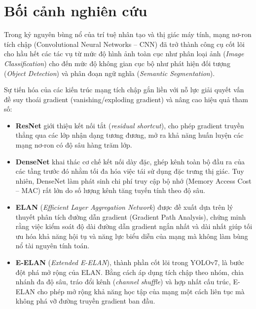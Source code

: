 \documentclass[fontsize=13pt,a4paper,oneside,DIV=calc,chapterprefix=true]{scrbook}
\begin{document}
\section{Bối cảnh nghiên cứu}
Trong kỷ nguyên bùng nổ của trí tuệ nhân tạo và thị giác máy tính, mạng nơ-ron tích chập (Convolutional Neural Networks -- CNN) đã trở thành công cụ cốt lõi cho hầu hết các tác vụ từ mức độ hình ảnh toàn cục như phân loại ảnh (\textit{Image Classification}) cho đến mức độ không gian cục bộ như phát hiện đối tượng (\textit{Object Detection}) và phân đoạn ngữ nghĩa (\textit{Semantic Segmentation}). 

Sự tiến hóa của các kiến trúc mạng tích chập gắn liền với nỗ lực giải quyết vấn đề suy thoái gradient (vanishing/exploding gradient) và nâng cao hiệu quả tham số:
\begin{itemize}[leftmargin=1.2cm]
    \item \textbf{ResNet} giới thiệu kết nối tắt (\textit{residual shortcut}), cho phép gradient truyền thẳng qua các lớp nhận dạng tương đương, mở ra khả năng huấn luyện các mạng nơ-ron có độ sâu hàng trăm lớp.
    \item \textbf{DenseNet} khai thác cơ chế kết nối dày đặc, ghép kênh toàn bộ đầu ra của các tầng trước đó nhằm tối đa hóa việc tái sử dụng đặc trưng thị giác. Tuy nhiên, DenseNet làm phát sinh chi phí truy cập bộ nhớ (Memory Access Cost -- MAC) rất lớn do số lượng kênh tăng tuyến tính theo độ sâu.
    \item \textbf{ELAN} (\textit{Efficient Layer Aggregation Network}) được đề xuất dựa trên lý thuyết phân tích đường dẫn gradient (Gradient Path Analysis), chứng minh rằng việc kiểm soát độ dài đường dẫn gradient ngắn nhất và dài nhất giúp tối ưu hóa khả năng hội tụ và năng lực biểu diễn của mạng mà không làm bùng nổ tài nguyên tính toán.
    \item \textbf{E-ELAN} (\textit{Extended E-ELAN}), thành phần cốt lõi trong YOLOv7, là bước đột phá mở rộng của ELAN. Bằng cách áp dụng tích chập theo nhóm, chia nhánh đa độ sâu, tráo đổi kênh (\textit{channel shuffle}) và hợp nhất cấu trúc, E-ELAN cho phép mở rộng khả năng học tập của mạng một cách liên tục mà không phá vỡ đường truyền gradient ban đầu.
\end{itemize}
\end{document}
